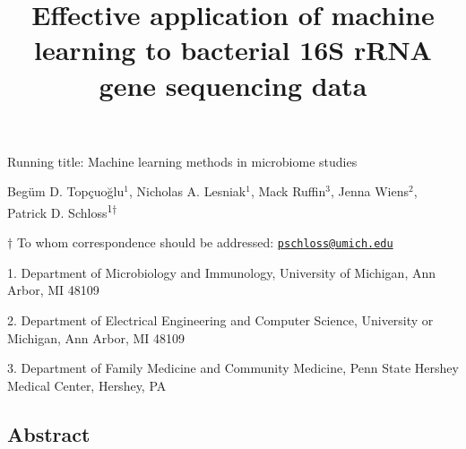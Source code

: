 \documentclass[11pt,]{article}
\title{\textbf{Effective application of machine learning to bacterial 16S rRNA
gene sequencing data}}
\author{}
\date{}
\begin{document}
\maketitle

\vspace{35mm}

Running title: Machine learning methods in microbiome studies

\vspace{35mm}

Begüm D. Topçuoğlu\({^1}\), Nicholas A. Lesniak\({^1}\), Mack
Ruffin\({^3}\), Jenna Wiens\({^2}\), Patrick D.
Schloss\textsuperscript{1\(\dagger\)}

\vspace{38mm}

\(\dagger\) To whom correspondence should be addressed:
\href{mailto:pschloss@umich.edu}{\nolinkurl{pschloss@umich.edu}}

1. Department of Microbiology and Immunology, University of Michigan,
Ann Arbor, MI 48109

2. Department of Electrical Engineering and Computer Science, University
or Michigan, Ann Arbor, MI 48109

3. Department of Family Medicine and Community Medicine, Penn State
Hershey Medical Center, Hershey, PA

\newpage

\linenumbers

\subsection{Abstract}\label{abstract}
\end{document}
